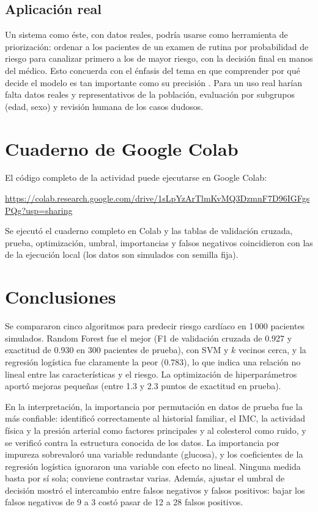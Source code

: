 \documentclass[11pt,letterpaper]{article}
\begin{document}
\subsection{Aplicación real}

Un sistema como éste, con datos reales, podría usarse como herramienta de priorización: ordenar a los pacientes de un examen de rutina por probabilidad de riesgo para canalizar primero a los de mayor riesgo, con la decisión final en manos del médico. Esto concuerda con el énfasis del tema en que comprender por qué decide el modelo es tan importante como su precisión \parencite{iae_u4_t43}. Para un uso real harían falta datos reales y representativos de la población, evaluación por subgrupos (edad, sexo) y revisión humana de los casos dudosos.

\section{Cuaderno de Google Colab}

El código completo de la actividad puede ejecutarse en Google Colab:

\begin{center}
    \url{https://colab.research.google.com/drive/1sLpYzArTlmKvMQ3DzmnF7D96IGFgsPQg?usp=sharing}
\end{center}

Se ejecutó el cuaderno completo en Colab y las tablas de validación cruzada, prueba, optimización, umbral, importancias y falsos negativos coincidieron con las de la ejecución local (los datos son simulados con semilla fija).

\section{Conclusiones}

Se compararon cinco algoritmos para predecir riesgo cardíaco en 1\,000 pacientes simulados. Random Forest fue el mejor (F1 de validación cruzada de 0.927 y exactitud de 0.930 en 300 pacientes de prueba), con SVM y $k$ vecinos cerca, y la regresión logística fue claramente la peor (0.783), lo que indica una relación no lineal entre las características y el riesgo. La optimización de hiperparámetros aportó mejoras pequeñas (entre 1.3 y 2.3 puntos de exactitud en prueba).

En la interpretación, la importancia por permutación en datos de prueba fue la más confiable: identificó correctamente al historial familiar, el IMC, la actividad física y la presión arterial como factores principales y al colesterol como ruido, y se verificó contra la estructura conocida de los datos. La importancia por impureza sobrevaloró una variable redundante (glucosa), y los coeficientes de la regresión logística ignoraron una variable con efecto no lineal. Ninguna medida basta por sí sola; conviene contrastar varias. Además, ajustar el umbral de decisión mostró el intercambio entre falsos negativos y falsos positivos: bajar los falsos negativos de 9 a 3 costó pasar de 12 a 28 falsos positivos.
\end{document}
